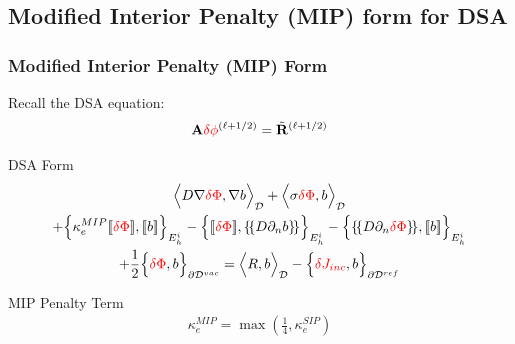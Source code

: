 \documentclass[compress,10pt]{beamer}
\renewcommand{\vec}[1]{\mathbf{#1}}
\newcommand{\tcr}[1]{\textcolor{red}{#1}}
\begin{document}
\subsection{Modified Interior Penalty (MIP) form for DSA}
\begin{frame}[t]\frametitle{Modified Interior Penalty (MIP) Form}

Recall the DSA equation:
\begin{equation*}
{\bf A} \tcr{\delta \phi}^{(\ell+1/2)} = \tilde{{\bf R}}^{(\ell+1/2)}
\end{equation*}
 
\begin{block}{DSA Form}{\footnotesize
\begin{gather*}
\Big<  D \vec{\nabla} \tcr{\delta \Phi} , \vec{\nabla} b  \Big>_{\mathcal{D}} 
+ \Big<  \sigma \tcr{\delta  \Phi} ,  b  \Big>_{\mathcal{D}}    \\
+ \Big\{ \kappa_e^{MIP} [\![ \tcr{\delta  \Phi} ]\!] , [\![  b ]\!]\Big\}_{E_h^i} 
- \Big\{  [\![  \tcr{\delta \Phi} ]\!] , \{\!\{  D \partial_n b \}\!\}\Big\}_{E_h^i} 
- \Big\{ \{\!\{  D \partial_n \tcr{\delta \Phi} \}\!\} , [\![ b ]\!]\Big\}_{E_h^i} \\
+ \frac{1}{2} \Big\{  \tcr{\delta  \Phi} ,   b \Big\}_{\partial \mathcal{D}^{vac}} 
 = \Big<  R , b  \Big>_{\mathcal{D}}  -  \Big\{  \tcr{\delta J_{inc}}, b  \Big\}_{\partial \mathcal{D}^{ref}}
\end{gather*} 
}
\end{block}

\begin{block}{MIP Penalty Term}{\footnotesize
		\begin{align*}
			\kappa_e^{MIP} = \max\left(\frac{1}{4},  \kappa_e^{SIP}\right)
		\end{align*} }
	\end{block}
\end{frame}
%
\end{document}
